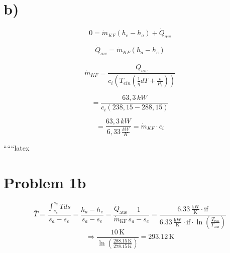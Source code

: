 

\section*{b)}

\[
0 = \dot{m}_{KF} (h_e - h_a) + \dot{Q}_{aw}
\]

\[
\dot{Q}_{aw} = \dot{m}_{KF} (h_a - h_e)
\]

\[
\dot{m}_{KF} = \frac{\dot{Q}_{aw}}{c_i \left( T_{ein} \left( \frac{1}{\eta} dT + \frac{v}{P_2} \right) \right)}
\]

\[
= \frac{63,3 \, kW}{c_i (238,15 - 288,15)}
\]

\[
= \frac{63,3 \, kW}{6,33 \, \frac{kW}{K}} = \dot{m}_{KF} \cdot c_i
\]

``````latex

\section*{Problem 1b}
\[
\overline{T} = \frac{\int_{s_e}^{s_a} T ds}{s_a - s_e} = \frac{h_a - h_e}{s_a - s_e} = \frac{\dot{Q}_{\text{aus}}}{\dot{m}_{\text{KF}}} \frac{1}{s_a - s_e} = \frac{6.33 \, \frac{\text{kW}}{\text{K}} \cdot \text{if}}{6.33 \, \frac{\text{kW}}{\text{K}} \cdot \text{if} \cdot \ln \left( \frac{T_{\text{ein}}}{T_{\text{aus}}} \right)}
\]
\[
\Rightarrow \frac{10 \, \text{K}}{\ln \left( \frac{288.15 \, \text{K}}{278.15 \, \text{K}} \right)} = 293.12 \, \text{K}
\]